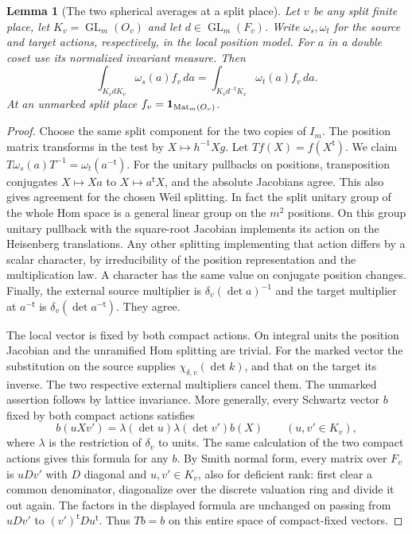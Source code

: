 \documentclass[a4paper,11pt]{article}
\newtheorem{lemma}[proposition]{Lemma}
\theoremstyle{definition}
\theoremstyle{remark}
\numberwithin{equation}{section}
\begin{document}
\begin{lemma}[The two spherical averages at a split place]
\leavevmode\label{lem:splitaverage826}
Let \(v\) be any split finite place, let \(K_v=\operatorname{GL}_m(O_v)\)
and let \(d\in\operatorname{GL}_m(F_v)\).
Write \(\omega_s,\omega_t\) for the source and target actions,
respectively, in the local position model. For \(a\) in a
double coset use its normalized invariant measure. Then
\[
   \int_{K_v d K_v}\omega_s(a) f_v\,da
       =\int_{K_v d^{-\mathsf t} K_v}\omega_t(a) f_v\,da .
\]
At an unmarked split place \(f_v={\bf1}_{\operatorname{Mat}_m(O_v)}\).
\end{lemma}
\begin{proof}
Choose the same split component for the two copies of \(I_m\).
The position matrix transforms in the test by
\(X\mapsto h^{-1}Xg\). Let \(Tf(X)=f(X^{\mathsf t})\).
We claim \(T\omega_s(a)T^{-1}=\omega_t(a^{-\mathsf t})\).
For the unitary pullbacks on positions, transposition conjugates
\(X\mapsto Xa\) to \(X\mapsto a^{\mathsf t}X\), and the
absolute Jacobians agree. This also gives agreement for the
chosen Weil splitting. In fact the split unitary group of
the whole Hom space is a general linear group on the
\(m^2\) positions. On this group unitary pullback with the
square-root Jacobian implements its action on the Heisenberg
translations. Any other splitting implementing that action
differs by a scalar character, by irreducibility of the
position representation and the multiplication law. A character
has the same value on conjugate position changes. Finally,
the external source multiplier is \(\delta_v(\det a)^{-1}\)
and the target multiplier at \(a^{-\mathsf t}\) is
\(\delta_v(\det a^{-\mathsf t})\). They agree.

The local vector is fixed by both compact actions. On integral
units the position Jacobian and the unramified Hom splitting
are trivial. For the marked vector the substitution on the
source supplies \(\chi_{\delta,v}(\det k)\), and that on the
target its inverse. The two respective external multipliers
cancel them. The unmarked assertion follows by lattice
invariance. More generally, every Schwartz vector \(b\)
fixed by both compact actions satisfies
\[
 b(uXv')=\lambda(\det u)\lambda(\det v')b(X)
               \qquad (u,v'\in K_v),
\]
where \(\lambda\) is the restriction of \(\delta_v\) to units.
The same calculation of the two compact actions gives this
formula for any \(b\). By Smith normal form, every matrix over
\(F_v\) is \(u D v'\) with \(D\) diagonal and \(u,v'\in K_v\),
also for deficient rank: first clear a common denominator,
diagonalize over the discrete valuation ring and divide it
out again. The factors in the displayed formula are unchanged
on passing from \(uDv'\) to \((v')^{\mathsf t}Du^{\mathsf t}\).
Thus \(Tb=b\) on this entire space of compact-fixed vectors.


\end{proof}
\end{document}
